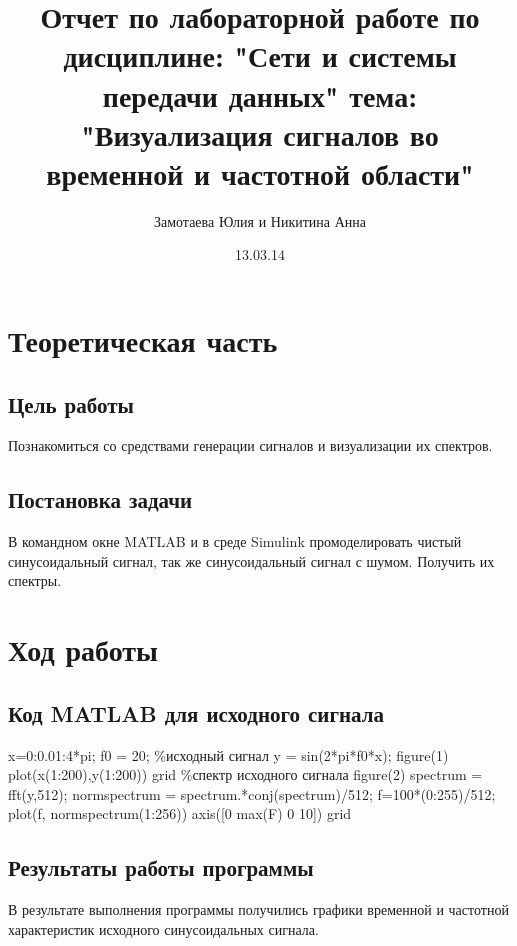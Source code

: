 \documentclass[10pt,a4paper]{report}
\author{Замотаева Юлия и Никитина Анна}
\title{Отчет по лабораторной работе по дисциплине: "Сети и системы передачи данных"\newline
тема: "Визуализация сигналов во временной и частотной области"}
\date{13.03.14}
\begin{document}
\maketitle
\pagebreak
\chapter{Теоретическая часть}
\section{Цель работы}
Познакомиться со средствами генерации сигналов и визуализации их спектров.
\section{Постановка задачи}
В командном окне MATLAB и в среде Simulink промоделировать чистый синусоидальный сигнал, так же синусоидальный сигнал с шумом. Получить их спектры.

\chapter{Ход работы}
\section{Код MATLAB для исходного сигнала}
x=0:0.01:4*pi;\newline
f0 = 20;\newline
\%исходный сигнал\newline
y = sin(2*pi*f0*x);\newline
figure(1)\newline
plot(x(1:200),y(1:200))\newline
grid\newline
\%спектр исходного сигнала\newline
figure(2)\newline
spectrum = fft(y,512);\newline
normspectrum = spectrum.*conj(spectrum)/512;\newline
f=100*(0:255)/512;\newline
plot(f, normspectrum(1:256))\newline
axis([0 max(F) 0 10])\newline
grid\newline

\section{Результаты работы программы}
В результате выполнения программы получились графики временной и частотной характеристик исходного синусоидальных сигнала. \newpage
\end{document}
